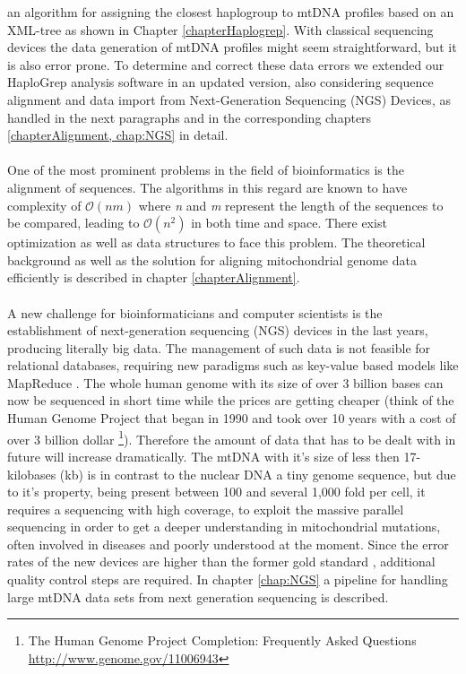 an algorithm for assigning the closest haplogroup to mtDNA profiles based on an XML-tree as shown in Chapter \ref{chapterHaplogrep}. With classical sequencing devices the data generation of mtDNA profiles might seem straightforward, but it is also error prone. To determine and correct these data errors we extended our HaploGrep analysis software in an updated version, also considering sequence alignment and data import from Next-Generation Sequencing (NGS) Devices, as handled in the next paragraphs and in the corresponding chapters \ref{chapterAlignment, chap:NGS} in detail.
\\
\\
One of the most prominent problems in the field of bioinformatics is the alignment of sequences. The algorithms in this regard are known to have complexity of $\mathcal O(nm)$ where \textit{n} and \textit{m} represent the length of the sequences to be compared, leading to $\mathcal O(n^2)$ in both time and space. There exist optimization as well as data structures to face this problem. The theoretical background as well as the solution for aligning mitochondrial genome data efficiently is described in chapter \ref{chapterAlignment}.
\\
\\
A new challenge for bioinformaticians and computer scientists is the establishment of next-generation sequencing (NGS) devices in the last years, producing literally big data. The management of such data is not feasible for relational databases, requiring new paradigms such as key-value based models like MapReduce \cite{Dean2008}. The whole human genome with its size of over 3 billion bases can now be sequenced in short time while the prices are getting cheaper (think of the Human Genome Project that began in 1990 and took over 10 years with a cost of over 3 billion dollar \footnote{The Human Genome Project Completion: Frequently Asked Questions \url{http://www.genome.gov/11006943}}). Therefore the amount of data that has to be dealt with in future will increase dramatically. The mtDNA with it's size of less then 17-kilobases (kb) is in contrast to the nuclear DNA a tiny genome sequence, but due to it's property, being present between 100 and several 1,000 fold per cell, it requires a sequencing with high coverage, to exploit the massive parallel sequencing in order to get a deeper understanding in mitochondrial mutations, often involved in diseases and poorly understood at the moment. Since the error rates of the new devices are higher than the former gold standard \cite{Wang2011}, additional quality control steps are required. In chapter \ref{chap:NGS} a pipeline for handling large mtDNA data sets from next generation sequencing is described.
